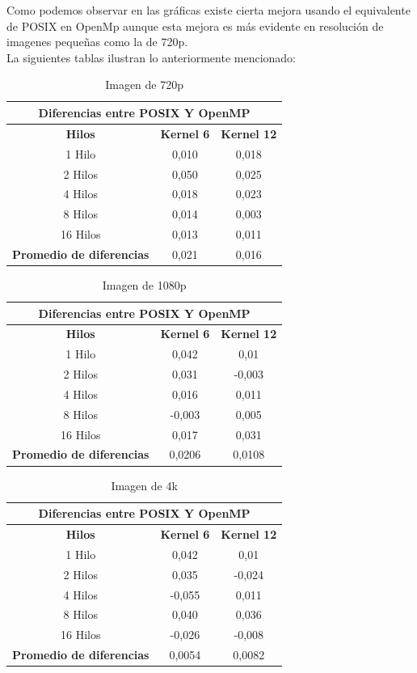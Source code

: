 \documentclass{IEEEtran}
\begin{document}
Como podemos observar en las gráficas existe cierta mejora usando el equivalente de POSIX en OpenMp aunque esta mejora es más evidente en resolución de imagenes pequeñas como la de 720p.\\
La siguientes tablas ilustran lo anteriormente mencionado:\\
\begin{table}[H]
\centering
    \begin{tabular}{ |c|c|c| } 
\hline
\multicolumn{3}{|c|}{\textbf{Diferencias entre POSIX Y OpenMP}} \\
\hline
\textbf{Hilos} & \textbf{Kernel 6} & \textbf{Kernel 12}\\
\hline
1 Hilo & 0,010 & 0,018\\
 \hline
2 Hilos & 0,050 & 0,025 \\ 
 \hline
4 Hilos & 0,018 & 0,023 \\ 
 \hline
8 Hilos & 0,014 & 0,003\\ 
 \hline
16 Hilos & 0,013 & 0,011\\ 
\hline
\textbf{Promedio de diferencias} & 0,021 & 0,016\\ 
\hline
\end{tabular}
\caption{Imagen de 720p}
\end{table}

\begin{table}[H]
\centering
    \begin{tabular}{ |c|c|c| } 
\hline
\multicolumn{3}{|c|}{\textbf{Diferencias entre POSIX Y OpenMP}} \\
\hline
\textbf{Hilos} & \textbf{Kernel 6} & \textbf{Kernel 12}\\
\hline
1 Hilo & 0,042 & 0,01\\
 \hline
2 Hilos & 0,031 & -0,003 \\ 
 \hline
4 Hilos & 0,016 & 0,011 \\ 
 \hline
8 Hilos & -0,003 & 0,005\\ 
 \hline
16 Hilos & 0,017 & 0,031\\ 
\hline
\textbf{Promedio de diferencias} & 0,0206 & 0,0108\\ 
\hline
\end{tabular}
\caption{Imagen de 1080p}
\end{table}

\begin{table}[H]
\centering
    \begin{tabular}{ |c|c|c| } 
\hline
\multicolumn{3}{|c|}{\textbf{Diferencias entre POSIX Y OpenMP}} \\
\hline
\textbf{Hilos} & \textbf{Kernel 6} & \textbf{Kernel 12}\\
\hline
1 Hilo & 0,042 & 0,01\\
 \hline
2 Hilos & 0,035 & -0,024 \\ 
 \hline
4 Hilos & -0,055 & 0,011 \\ 
 \hline
8 Hilos & 0,040 & 0,036\\ 
 \hline
16 Hilos & -0,026 & -0,008\\ 
\hline
\textbf{Promedio de diferencias} & 0,0054 & 0,0082\\ 
\hline
\end{tabular}
\caption{Imagen de 4k}
\end{table}
\end{document}
